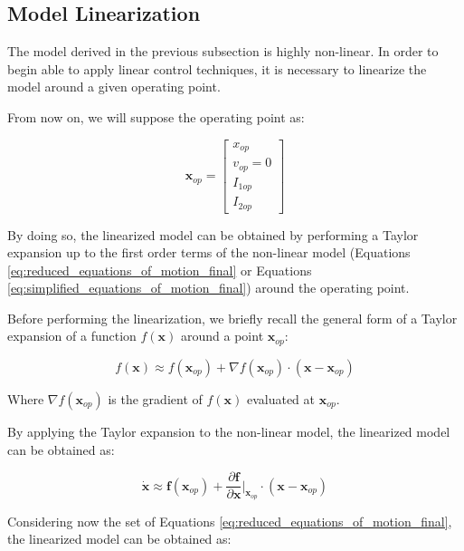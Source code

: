 \subsection{Model Linearization}
\label{subsec:model_linearization}

The model derived in the previous subsection is highly non-linear.
In order to begin able to apply linear control techniques, it is necessary to linearize the model around a given operating point.

From now on, we will suppose the operating point as:

\begin{equation}
    \mathbf{x}_{op} =
    \begin{bmatrix}
        x_{op}     \\
        v_{op} = 0 \\
        I_{1op}    \\
        I_{2op}
    \end{bmatrix}
\end{equation}

By doing so, the linearized model can be obtained by performing a Taylor expansion up to the first order terms of the non-linear model (Equations \ref{eq:reduced_equations_of_motion_final} or Equations \ref{eq:simplified_equations_of_motion_final}) around the operating point.

Before performing the linearization, we briefly recall the general form of a Taylor expansion of a function $f(\mathbf{x})$ around a point $\mathbf{x}_{op}$:

\begin{equation}
    f(\mathbf{x}) \approx f(\mathbf{x}_{op}) + \nabla f(\mathbf{x}_{op}) \cdot (\mathbf{x} - \mathbf{x}_{op})
\end{equation}

Where $\nabla f(\mathbf{x}_{op})$ is the gradient of $f(\mathbf{x})$ evaluated at $\mathbf{x}_{op}$.

By applying the Taylor expansion to the non-linear model, the linearized model can be obtained as:

\begin{equation}
    \dot{\mathbf{x}} \approx \mathbf{f}(\mathbf{x}_{op}) + \frac{\partial \mathbf{f}}{\partial \mathbf{x}} \Bigg|_{\mathbf{x}_{op}} \cdot (\mathbf{x} - \mathbf{x}_{op})
\end{equation}

Considering now the set of Equations \ref{eq:reduced_equations_of_motion_final}, the linearized model can be obtained as:
